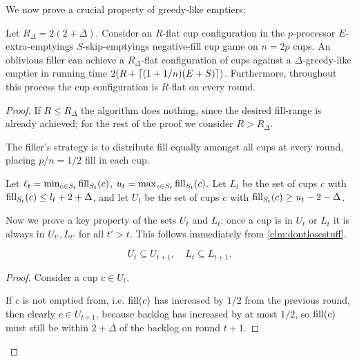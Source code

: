We now prove a crucial property of greedy-like emptiers: 
\begin{lemma}
  \label{lem:greedylikeisflat}
  Let $R_\Delta = 2(2+\Delta)$.
  Consider an $R$-flat cup configuration in the $p$-processor
  $E$-extra-emptyings $S$-skip-emptyings negative-fill cup game on $n =
  2p$ cups. An oblivious filler can achieve a $R_\Delta$-flat
  configuration of cups against a $\Delta$-greedy-like emptier in
  running time $2(R + \left\lceil (1+1/n)(E + S) \right\rceil)$. Furthermore, throughout this
  process the cup configuration is $R$-flat on every round.
\end{lemma}
\begin{proof}
  If $R \le R_\Delta$ the algorithm does nothing, since the
  desired fill-range is already achieved; for
  the rest of the proof we consider $R > R_\Delta$.

  The filler's strategy is to distribute fill equally amongst all
  cups at every round, placing $p/n = 1/2$ fill in each cup. 

  Let $\ell_t = \min_{c\in S_t} \operatorname{\textnormal{fill}}_{S_t}(c)$, $u_t = \max_{c\in S_t} \operatorname{\textnormal{fill}}_{S_t}(c)$. 
  Let $L_t$ be the set of cups $c$ with $\operatorname{\textnormal{fill}}_{S_t}(c) \le l_t+2+\Delta$, and let
  $U_t$ be the set of cups $c$ with $\operatorname{\textnormal{fill}}_{S_t}(c) \ge u_t-2-\Delta$.

  Now we prove a key property of the sets $U_t$ and $L_t$: once a cup is in
  $U_t$ or $L_t$ it is always in $U_{t'}, L_{t'}$ for all $t' > t$. This
  follows immediately from \cref{clm:dontlosestuff}.
  \begin{clm}
    \label{clm:dontlosestuff}
    $$U_{t} \subseteq U_{t+1},\quad L_t \subseteq L_{t+1}.$$
  \end{clm}
  \begin{proof}
    Consider a cup $c\in U_t$.

    If $c$ is not emptied from, i.e. $\operatorname{\textnormal{fill}}(c)$ has increased by
    $1/2$ from the previous round, then
    clearly $c \in U_{t+1}$, because backlog has increased by at most $1/2$, so
    $\operatorname{\textnormal{fill}}(c)$ must still be within $2+\Delta$ of the backlog on round $t+1$. 


\end{proof}
\end{proof}
